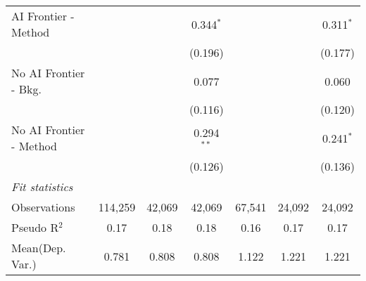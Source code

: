 \begin{tabular}{lcccccc}
   AI Frontier - Method    &               &               & 0.344$^{*}$   &               &               & 0.311$^{*}$\\   
                           &               &               & (0.196)       &               &               & (0.177)\\   
   No AI Frontier - Bkg.   &               &               & 0.077         &               &               & 0.060\\   
                           &               &               & (0.116)       &               &               & (0.120)\\   
   No AI Frontier - Method &               &               & 0.294$^{**}$  &               &               & 0.241$^{*}$\\   
                           &               &               & (0.126)       &               &               & (0.136)\\   
   \midrule
   \emph{Fit statistics}\\
   Observations            & 114,259       & 42,069        & 42,069        & 67,541        & 24,092        & 24,092\\  
   Pseudo R$^2$            & 0.17          & 0.18          & 0.18          & 0.16          & 0.17          & 0.17\\  
Mean(Dep. Var.) & 0.781 & 0.808 & 0.808 & 1.122 & 1.221 & 1.221 \\
   

\end{tabular}
